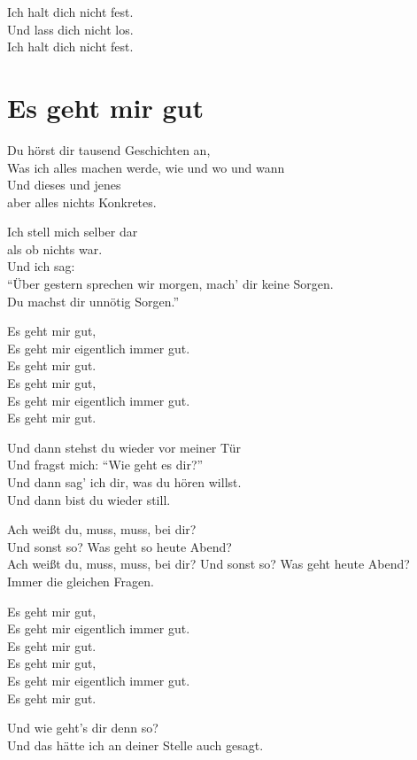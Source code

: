 \documentclass[]{book}
\begin{document}
Ich halt dich nicht fest.\\
Und lass dich nicht los.\\
Ich halt dich nicht fest.

\hypertarget{es-geht-mir-gut}{%
\section{Es geht mir gut}\label{es-geht-mir-gut}}

Du hörst dir tausend Geschichten an,\\
Was ich alles machen werde, wie und wo und wann\\
Und dieses und jenes\\
aber alles nichts Konkretes.

Ich stell mich selber dar\\
als ob nichts war.\\
Und ich sag:\\
``Über gestern sprechen wir morgen, mach' dir keine Sorgen.\\
Du machst dir unnötig Sorgen.''

Es geht mir gut,\\
Es geht mir eigentlich immer gut.\\
Es geht mir gut.\\
Es geht mir gut,\\
Es geht mir eigentlich immer gut.\\
Es geht mir gut.

Und dann stehst du wieder vor meiner Tür\\
Und fragst mich: ``Wie geht es dir?''\\
Und dann sag' ich dir, was du hören willst.\\
Und dann bist du wieder still.

Ach weißt du, muss, muss, bei dir?\\
Und sonst so? Was geht so heute Abend?\\
Ach weißt du, muss, muss, bei dir? Und sonst so? Was geht heute Abend?\\
Immer die gleichen Fragen.

Es geht mir gut,\\
Es geht mir eigentlich immer gut.\\
Es geht mir gut.\\
Es geht mir gut,\\
Es geht mir eigentlich immer gut.\\
Es geht mir gut.

Und wie geht's dir denn so?\\
Und das hätte ich an deiner Stelle auch gesagt.
\end{document}

